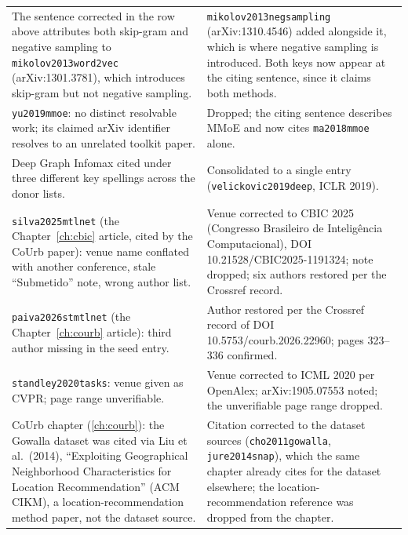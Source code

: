 {\begin{longtable}{@{}p{}p{}@{}}
\addlinespace
The sentence corrected in the row above attributes both skip-gram and negative sampling to
\texttt{mikolov2013word2vec} (arXiv:1301.3781), which introduces skip-gram but not negative
sampling. &
\texttt{mikolov2013negsampling} (arXiv:1310.4546) added alongside it, which is where negative
sampling is introduced. Both keys now appear at the citing sentence, since it claims both
methods. \\
\addlinespace
\texttt{yu2019mmoe}: no distinct resolvable work; its claimed arXiv identifier
resolves to an unrelated toolkit paper. &
Dropped; the citing sentence describes MMoE and now cites \texttt{ma2018mmoe} alone. \\
\addlinespace
Deep Graph Infomax cited under three different key spellings across the donor
lists. &
Consolidated to a single entry (\texttt{velickovic2019deep}, ICLR 2019). \\
\addlinespace
\texttt{silva2025mtlnet} (the Chapter~\ref{ch:cbic} article, cited by the CoUrb
paper): venue name conflated with another conference, stale ``Submetido''
note, wrong author list. &
Venue corrected to CBIC 2025 (Congresso Brasileiro de Intelig\^encia Computacional),
DOI 10.21528/CBIC2025-1191324; note dropped; six authors restored per the Crossref
record. \\
\addlinespace
\texttt{paiva2026stmtlnet} (the Chapter~\ref{ch:courb} article): third author
missing in the seed entry. &
Author restored per the Crossref record of DOI 10.5753/courb.2026.22960; pages
323--336 confirmed. \\
\addlinespace
\texttt{standley2020tasks}: venue given as CVPR; page range unverifiable. &
Venue corrected to ICML 2020 per OpenAlex; arXiv:1905.07553 noted; the unverifiable
page range dropped. \\
\addlinespace
CoUrb chapter (\ref{ch:courb}): the Gowalla dataset was cited via Liu et al.\ (2014),
``Exploiting Geographical Neighborhood Characteristics for Location Recommendation''
(ACM CIKM), a location-recommendation method paper, not the dataset source. &
Citation corrected to the dataset sources (\texttt{cho2011gowalla},
\texttt{jure2014snap}), which the same chapter already cites for the dataset
elsewhere; the location-recommendation reference was dropped from the chapter. \\
\end{longtable}
}

